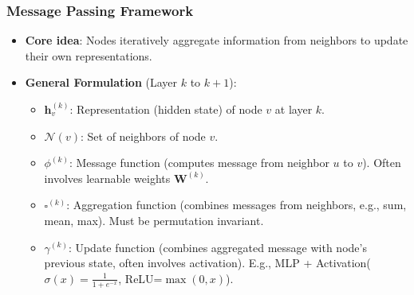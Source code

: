 \documentclass[aspectratio=169]{beamer}
\begin{document}
\begin{frame}
    \frametitle{Message Passing Framework}
    \begin{center}
        \begin{itemize}
            \item \textbf{Core idea}: Nodes iteratively aggregate information from neighbors to update their own representations.
            \item \textbf{General Formulation} (Layer $k$ to $k+1$):
                \begin{center}                
            \end{center}
            \begin{itemize}
                \item $\mathbf{h}_v^{(k)}$: Representation (hidden state) of node $v$ at layer $k$.
                \item $\mathcal{N}(v)$: Set of neighbors of node $v$.
                \item $\phi^{(k)}$: Message function (computes message from neighbor $u$ to $v$). Often involves learnable weights $\mathbf{W}^{(k)}$.
                \item $\square^{(k)}$: Aggregation function (combines messages from neighbors, e.g., sum, mean, max). Must be permutation invariant.
                \item $\gamma^{(k)}$: Update function (combines aggregated message with node's previous state, often involves activation). E.g., MLP + Activation($\sigma(x) = \frac{1}{1+e^{-x}}$, ReLU=$\max(0,x)$).
            \end{itemize}
        \end{itemize}
    \end{center}
\end{frame}
\end{document}
